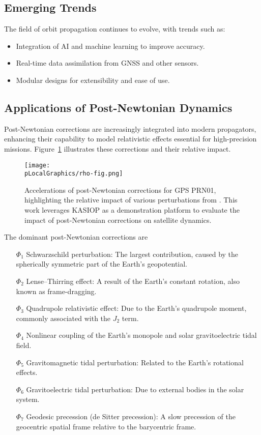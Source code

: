 \subsection{Emerging Trends}
The field of orbit propagation continues to evolve, with trends such as:
\begin{itemize}
    \item Integration of AI and machine learning to improve accuracy.
    \item Real-time data assimilation from GNSS and other sensors.
    \item Modular designs for extensibility and ease of use.
\end{itemize}

\subsection{Applications of Post-Newtonian Dynamics}
Post-Newtonian corrections are increasingly integrated into modern propagators, enhancing their capability to model relativistic effects essential for high-precision missions. Figure~\ref{fig:pn_corrections} illustrates these corrections and their relative impact.

\begin{figure}[htbp]
    \centering
    \texttt{[image: \\pLocalGraphics/rho-fig.png]}
    \caption{Accelerations of post-Newtonian corrections for GPS PRN01, highlighting the relative impact of various perturbations from \cite{roh2018numerical}. This work leverages KASIOP \cite{ROH20162255} as a demonstration platform to evaluate the impact of post-Newtonian corrections on satellite dynamics.}
    \label{fig:pn_corrections}
\end{figure}

The dominant post-Newtonian corrections are
\begin{itemize}
    \item[\(\Phi_1\)] Schwarzschild perturbation: The largest contribution, caused by the spherically symmetric part of the Earth's geopotential.
    \item[\(\Phi_2\)] Lense–Thirring effect: A result of the Earth's constant rotation, also known as frame-dragging.
    \item[\(\Phi_3\)] Quadrupole relativistic effect: Due to the Earth's quadrupole moment, commonly associated with the \(J_2\) term.
    \item[\(\Phi_4\)] Nonlinear coupling of the Earth's monopole and solar gravitoelectric tidal field.
    \item[\(\Phi_5\)] Gravitomagnetic tidal perturbation: Related to the Earth's rotational effects.
    \item[\(\Phi_6\)] Gravitoelectric tidal perturbation: Due to external bodies in the solar system.
    \item[\(\Phi_7\)] Geodesic precession (de Sitter precession): A slow precession of the geocentric spatial frame relative to the barycentric frame.
\end{itemize}

\endinput  %
